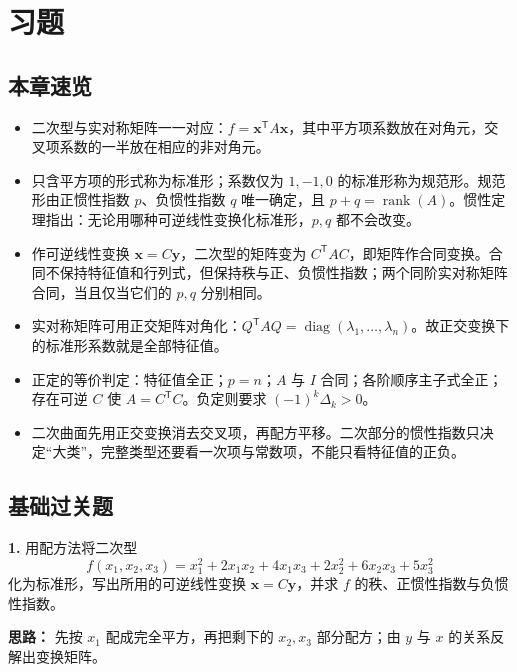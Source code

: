 \section{习题}

\subsection{本章速览}
\begin{itemize}
  \item 二次型与实对称矩阵一一对应：\(f=\mathbf{x}^{\mathsf T}A\mathbf{x}\)，其中平方项系数放在对角元，交叉项系数的一半放在相应的非对角元。
  \item 只含平方项的形式称为标准形；系数仅为 \(1,-1,0\) 的标准形称为规范形。规范形由正惯性指数 \(p\)、负惯性指数 \(q\) 唯一确定，且 \(p+q=\operatorname{rank}(A)\)。惯性定理指出：无论用哪种可逆线性变换化标准形，\(p,q\) 都不会改变。
  \item 作可逆线性变换 \(\mathbf{x}=C\mathbf{y}\)，二次型的矩阵变为 \(C^{\mathsf T}AC\)，即矩阵作合同变换。合同不保持特征值和行列式，但保持秩与正、负惯性指数；两个同阶实对称矩阵合同，当且仅当它们的 \(p,q\) 分别相同。
  \item 实对称矩阵可用正交矩阵对角化：\(Q^{\mathsf T}AQ=\operatorname{diag}(\lambda_1,\ldots,\lambda_n)\)。故正交变换下的标准形系数就是全部特征值。
  \item 正定的等价判定：特征值全正；\(p=n\)；\(A\) 与 \(I\) 合同；各阶顺序主子式全正；存在可逆 \(C\) 使 \(A=C^{\mathsf T}C\)。负定则要求 \((-1)^k\Delta_k>0\)。
  \item 二次曲面先用正交变换消去交叉项，再配方平移。二次部分的惯性指数只决定“大类”，完整类型还要看一次项与常数项，不能只看特征值的正负。
\end{itemize}

\subsection{基础过关题}

\textbf{1.} 用配方法将二次型
\[
f(x_1,x_2,x_3)=x_1^2+2x_1x_2+4x_1x_3+2x_2^2+6x_2x_3+5x_3^2
\]
化为标准形，写出所用的可逆线性变换 \(\mathbf{x}=C\mathbf{y}\)，并求 \(f\) 的秩、正惯性指数与负惯性指数。

\ifshowsolutions%

\textbf{思路：} 先按 \(x_1\) 配成完全平方，再把剩下的 \(x_2,x_3\) 部分配方；由 \(y\) 与 \(x\) 的关系反解出变换矩阵。

